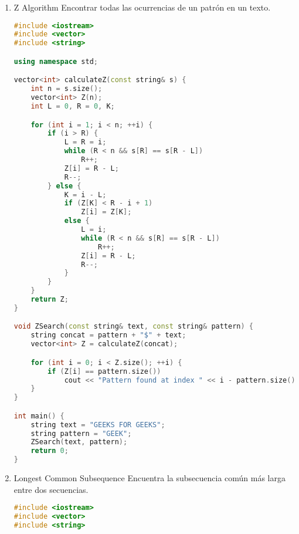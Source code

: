 \begin{enumerate}
\begin{lstlisting}[language=C++]
    for (i = 0; i < M - 1; i++)
        h = (h * d) % q;

    for (i = 0; i < M; i++) {
        p = (d * p + pat[i]) % q;
        t = (d * t + txt[i]) % q;
    }

    for (i = 0; i <= N - M; i++) {
        if (p == t) {
            for (j = 0; j < M; j++) {
                if (txt[i + j] != pat[j])
                    break;
            }
            if (j == M)
                cout << "Pattern found at index " << i << endl;
        }

        if (i < N - M) {
            t = (d * (t - txt[i] * h) + txt[i + M]) % q;
            if (t < 0)
                t = (t + q);
        }
    }
}

int main() {
    string txt = "GEEKS FOR GEEKS";
    string pat = "GEEK";
    RabinKarpSearch(pat, txt);
    return 0;
}
	\end{lstlisting}
	\item Z Algorithm
	 Encontrar todas las ocurrencias de un patrón en un texto.
	\begin{lstlisting}[language=C++]
	#include <iostream>
#include <vector>
#include <string>

using namespace std;

vector<int> calculateZ(const string& s) {
    int n = s.size();
    vector<int> Z(n);
    int L = 0, R = 0, K;

    for (int i = 1; i < n; ++i) {
        if (i > R) {
            L = R = i;
            while (R < n && s[R] == s[R - L])
                R++;
            Z[i] = R - L;
            R--;
        } else {
            K = i - L;
            if (Z[K] < R - i + 1)
                Z[i] = Z[K];
            else {
                L = i;
                while (R < n && s[R] == s[R - L])
                    R++;
                Z[i] = R - L;
                R--;
            }
        }
    }
    return Z;
}

void ZSearch(const string& text, const string& pattern) {
    string concat = pattern + "$" + text;
    vector<int> Z = calculateZ(concat);

    for (int i = 0; i < Z.size(); ++i) {
        if (Z[i] == pattern.size())
            cout << "Pattern found at index " << i - pattern.size() - 1 << endl;
    }
}

int main() {
    string text = "GEEKS FOR GEEKS";
    string pattern = "GEEK";
    ZSearch(text, pattern);
    return 0;
}
	\end{lstlisting}
	\item Longest Common Subsequence
	Encuentra la subsecuencia común más larga entre dos secuencias.
	\begin{lstlisting}[language=C++]
	#include <iostream>
#include <vector>
#include <string>


\end{lstlisting}
\end{enumerate}
